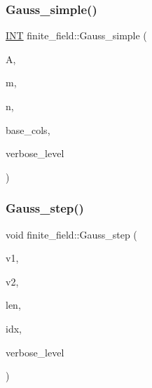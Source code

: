 \subsubsection{\texorpdfstring{Gauss\+\_\+simple()}{Gauss\_simple()}}
{\footnotesize\ttfamily \mbox{\hyperlink{galois_8h_a09fddde158a3a20bd2dcadb609de11dc}{I\+NT}} finite\+\_\+field\+::\+Gauss\+\_\+simple (\begin{DoxyParamCaption}\item[{\mbox{\hyperlink{galois_8h_a09fddde158a3a20bd2dcadb609de11dc}{I\+NT}} $\ast$}]{A,  }\item[{\mbox{\hyperlink{galois_8h_a09fddde158a3a20bd2dcadb609de11dc}{I\+NT}}}]{m,  }\item[{\mbox{\hyperlink{galois_8h_a09fddde158a3a20bd2dcadb609de11dc}{I\+NT}}}]{n,  }\item[{\mbox{\hyperlink{galois_8h_a09fddde158a3a20bd2dcadb609de11dc}{I\+NT}} $\ast$}]{base\+\_\+cols,  }\item[{\mbox{\hyperlink{galois_8h_a09fddde158a3a20bd2dcadb609de11dc}{I\+NT}}}]{verbose\+\_\+level }\end{DoxyParamCaption})}

\mbox{\label{classfinite__field_a888228cd0bdf000bd4d44cf4d1ad62ce}} 
\subsubsection{\texorpdfstring{Gauss\+\_\+step()}{Gauss\_step()}}
{\footnotesize\ttfamily void finite\+\_\+field\+::\+Gauss\+\_\+step (\begin{DoxyParamCaption}\item[{\mbox{\hyperlink{galois_8h_a09fddde158a3a20bd2dcadb609de11dc}{I\+NT}} $\ast$}]{v1,  }\item[{\mbox{\hyperlink{galois_8h_a09fddde158a3a20bd2dcadb609de11dc}{I\+NT}} $\ast$}]{v2,  }\item[{\mbox{\hyperlink{galois_8h_a09fddde158a3a20bd2dcadb609de11dc}{I\+NT}}}]{len,  }\item[{\mbox{\hyperlink{galois_8h_a09fddde158a3a20bd2dcadb609de11dc}{I\+NT}}}]{idx,  }\item[{\mbox{\hyperlink{galois_8h_a09fddde158a3a20bd2dcadb609de11dc}{I\+NT}}}]{verbose\+\_\+level }\end{DoxyParamCaption})}

